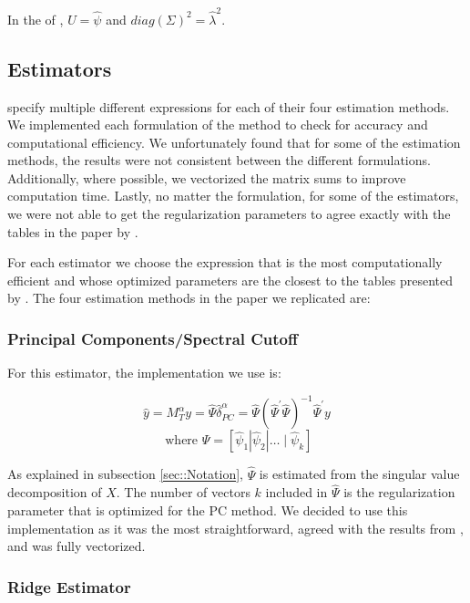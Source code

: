 In the of \citeauthor{carrasco2016sample}, $U = \hat{\psi}$ and $diag(\Sigma)^{2} = \hat{\lambda}^{2}$.

\subsection{Estimators} \label{sec::estimators}

\citeauthor{carrasco2016sample} specify multiple different expressions for each of their four estimation methods. We implemented each formulation of the method to check for accuracy and computational efficiency. We unfortunately found that for some of the estimation methods, the results were not consistent between the different formulations. Additionally, where possible, we vectorized the matrix sums to improve computation time. Lastly, no matter the formulation, for some of the estimators, we were not able to get the regularization parameters to agree exactly with the tables in the paper by \citeauthor{carrasco2016sample}.


For each estimator we choose the expression that is the most computationally efficient and whose optimized parameters are the closest to the tables presented by \citeauthor{carrasco2016sample}. The four estimation methods in the paper we replicated are:

\subsubsection{Principal Components/Spectral Cutoff}

For this estimator, the implementation we use is:

\[\widehat{y} = M_{T}^{\alpha} y = \widehat{\Psi} \hat{\delta}_{PC}^{\alpha} = \widehat{\Psi} \left(\widehat{\Psi}^{\prime} \widehat{\Psi}\right)^{-1} \widehat{\Psi}^{\prime} y\]
\[\text{ where } \widehat{\Psi} = \left[\widehat{\psi}_{1}\left|\widehat{\psi}_{2}\right| \ldots \mid \widehat{\psi}_{k}\right]\]

As explained in subsection \ref{sec::Notation}, $\hat{\Psi}$ is estimated from the singular value decomposition of $X$. The number of vectors $k$ included in $\hat{\Psi}$ is the regularization parameter that is optimized for the PC method. We decided to use this implementation as it was the most straightforward, agreed with the results from \citeauthor{carrasco2016sample}, and was fully vectorized.

\subsubsection{Ridge Estimator} \label{sec::ridge}

